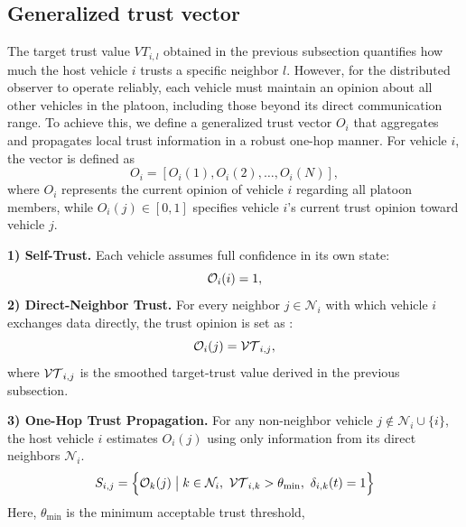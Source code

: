 \vspace*{-0.3cm}
\subsection{Generalized trust vector}
\label{subsec_generalized_trust_vector}
\vspace*{-0.2cm}
The target trust value $VT_{i,l}$ obtained in the previous subsection quantifies how much the host vehicle $i$ trusts a specific neighbor $l$.
However, for the distributed observer to operate reliably, each vehicle must maintain an opinion about all other vehicles in the platoon, including those beyond its direct communication range.
To achieve this, we define a generalized trust vector 
$O_i$ that aggregates and propagates local trust information in a robust one-hop manner. For vehicle $i$, the vector is defined as
\begin{equation}
O_i = [O_i(1), O_i(2), \ldots, O_i(N)] ,
\end{equation}
where $O_i$ represents the current opinion of vehicle $i$ regarding all platoon members, while $O_i(j) \in [0,1]$ specifies vehicle $i$'s current trust opinion toward vehicle $j$.

\vspace{1ex}
\noindent\textbf{1) Self-Trust.}
Each vehicle assumes full confidence in its own state:
\begin{equation}
\mathcal{O}_i(i) = 1 ,
\end{equation}
\vspace{1ex}
\noindent\textbf{2) Direct-Neighbor Trust.}
For every neighbor $j\in\mathcal{N}_i$ with which vehicle $i$ exchanges data directly, the trust opinion is set as :
\begin{equation}
\mathcal{O}_i(j) = \mathcal{VT}_{i,j} ,
\end{equation}
where $\mathcal{VT}_{i,j}$ is the smoothed target-trust value derived in the previous subsection.

\vspace{1ex}
\noindent\textbf{3) One-Hop Trust Propagation.}
For any non-neighbor vehicle $j\notin\mathcal{N}_i\cup\{i\}$, 
the host vehicle $i$ estimates $O_i(j)$ using only information from its direct neighbors $\mathcal{N}_i$.
\begin{equation}
S_{i,j} =
\Bigl\{ \mathcal{O}_k(j)
\;\big|\;
k \in \mathcal{N}_i,~
\mathcal{VT}_{i,k} > \theta_{\min},~
\delta_{i,k}(t) = 1\Bigr\}
\label{eq:Sij}
\end{equation}
Here, $\theta_{\min}$ is the minimum acceptable trust threshold, 

